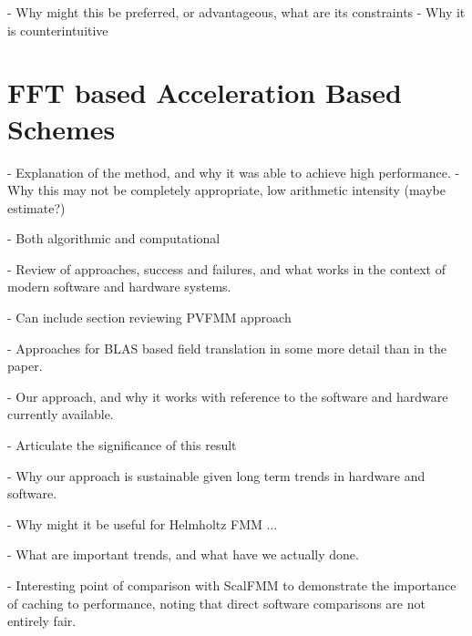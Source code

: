 - Why might this be preferred, or advantageous, what are its constraints
- Why it is counterintuitive


\section{FFT based Acceleration Based Schemes}

- Explanation of the method, and why it was able to achieve high performance.
- Why this may not be completely appropriate, low arithmetic intensity (maybe estimate?)


- Both algorithmic and computational

- Review of approaches, success and failures, and what works in the context of modern software and hardware systems.

- Can include section reviewing PVFMM approach

- Approaches for BLAS based field translation in some more detail than in the paper.

- Our approach, and why it works with reference to the software and hardware currently available.

- Articulate the significance of this result

- Why our approach is sustainable given long term trends in hardware and software.

- Why might it be useful for Helmholtz FMM ...

- What are important trends, and what have we actually done.

- Interesting point of comparison with ScalFMM to demonstrate the importance of caching to performance, noting that direct software comparisons are not entirely fair.

